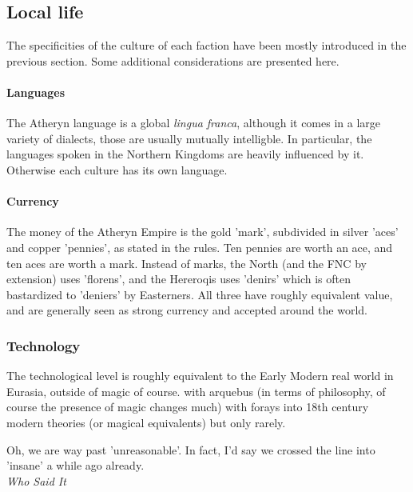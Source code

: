 \subsection{Local life}



The specificities of the culture of each faction have been mostly introduced in the previous section. Some additional considerations are presented here.

\paragraph{Languages}

The Atheryn language is a global \textit{lingua franca}, although it comes in a large variety of dialects, those are usually mutually intelligble. In particular, the languages spoken in the Northern Kingdoms are heavily influenced by it. Otherwise each culture has its own language.

\paragraph{Currency}

The money of the Atheryn Empire is the gold 'mark', subdivided in silver 'aces' and copper 'pennies', as stated in the rules. Ten pennies are worth an ace, and ten aces are worth a mark. Instead of marks, the North (and the FNC by extension) uses 'florens', and the Hereroqis uses 'denirs' which is often bastardized to 'deniers' by Easterners. All three have roughly equivalent value, and are generally seen as strong currency and accepted around the world.


\subsubsection{Technology}

The technological level is roughly equivalent to the Early Modern real world in Eurasia, outside of magic of course. with arquebus (in terms of philosophy, of course the presence of magic changes much) with forays into 18th century modern theories (or magical equivalents) but only rarely.


\begin{rpg-quotebox}
    Oh, we are way past 'unreasonable'. In fact, I'd say we crossed the line into 'insane' a while ago already. \\ \textendash \textit{Who Said It}
\end{rpg-quotebox}


